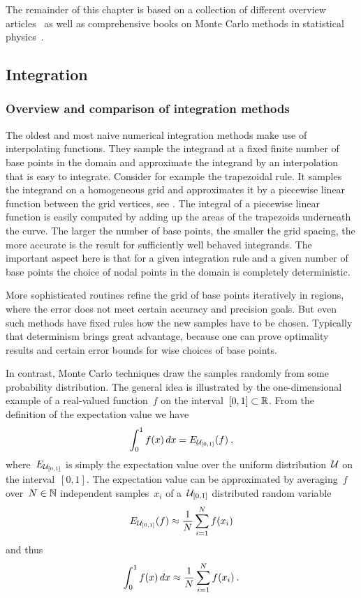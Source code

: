 The remainder of this chapter is based on a collection of different overview
articles~\cite{mc09, mc14, mc00} as well as comprehensive books on Monte Carlo
methods in statistical physics~\cite{mcbook, optinphysics}.

\subsection{Integration}\label{integration}

\subsubsection{Overview and comparison of integration methods}

The oldest and most naive numerical integration methods make use of
interpolating functions. They sample the integrand at a fixed finite number of
base points in the domain and approximate the integrand by an interpolation that
is easy to integrate. Consider for example the trapezoidal rule. It samples the
integrand on a homogeneous grid and approximates it by a piecewise linear
function between the grid vertices, see . The integral of a
piecewise linear function is easily computed by adding up the areas of the
trapezoids underneath the curve. The larger the number of base points, \ie{} the
smaller the grid spacing, the more accurate is the result for sufficiently well
behaved integrands. The important aspect here is that for a given integration
rule and a given number of base points the choice of nodal points in the domain
is completely deterministic.

More sophisticated routines refine the grid of base points iteratively in
regions, where the error does not meet certain accuracy and precision goals. But
even such  methods have fixed rules how the new samples have
to be chosen. Typically that determinism brings great advantage, because one can
prove optimality results and certain error bounds for wise choices of base
points.

In contrast, Monte Carlo techniques draw the samples randomly from some
probability distribution. The general idea is illustrated by the one-dimensional
example of a real-valued function~$f$ on the interval~$[0,1] \subset \mathbb{R}$. From
the definition of the expectation value we have
%
\begin{equation}\label{mcsimple}
  \int_0^1 f(x) \,dx = E_{\mathcal{U}_{[0,1]}}(f)\:,
\end{equation}
%
where~$E_{\mathcal{U}_{[0,1]}}$ is simply the expectation value over the uniform
distribution~$\mathcal{U}$ on the interval~$[0,1]$. The expectation value can be
approximated by averaging~$f$ over~$N \in \mathbb{N}$ independent samples~${x_i}$
of a~$\mathcal{U}_{[0,1]}$ distributed random variable
%
\begin{equation}\label{evapprox}
  E_{\mathcal{U}_{[0,1]}}(f) \approx \frac{1}{N} \sum_{i=1}^N f(x_i)
\end{equation}
%
and thus
%
\begin{equation}\label{mcsapprox}
  \int_0^1 f(x) \,dx \approx \frac{1}{N} \sum_{i=1}^N f(x_i)\:.
\end{equation}

